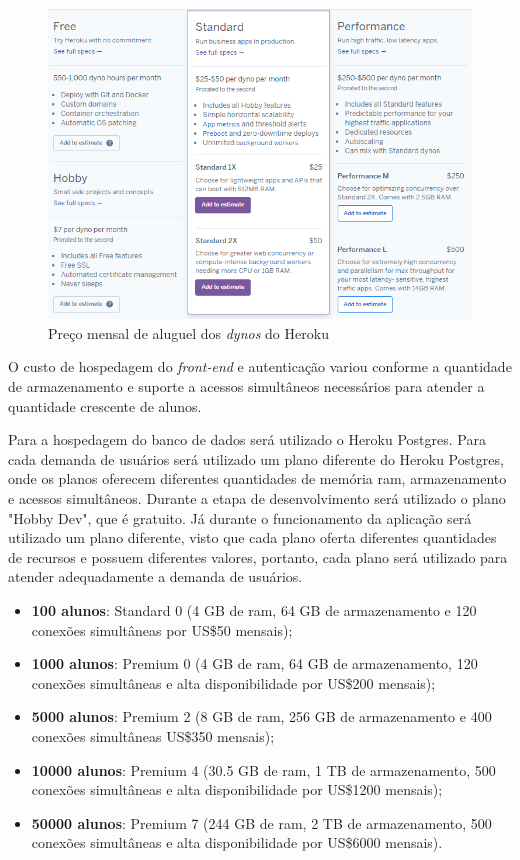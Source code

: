 \documentclass[
    12pt,               %
    openright,          %
    oneside,
    a4paper,            %
    english,            %
    brazil              %
    ]{ifsp-spo-inf-ctds} %
\begin{document}
\begin{figure}[htb]
    \centering
	\includegraphics[width=16cm]{imagens/precos-heroku.png}
	\caption{\label{fig:precos-heroku} Preço mensal de aluguel dos \textit{\glspl{dyno}} do Heroku}
\end{figure}

O custo de hospedagem do \textit{\gls{front-end}} e autenticação variou conforme a quantidade de armazenamento e suporte a acessos simultâneos necessários para atender a quantidade crescente de alunos.

Para a hospedagem do banco de dados será utilizado o Heroku Postgres. Para cada demanda de usuários será utilizado um plano diferente do Heroku Postgres, onde os planos oferecem diferentes quantidades de memória \ac{ram}, armazenamento e acessos simultâneos. Durante a etapa de desenvolvimento será utilizado o plano "Hobby Dev", que é gratuito. Já durante o funcionamento da aplicação será utilizado um plano diferente, visto que cada plano oferta diferentes quantidades de recursos e possuem diferentes valores, portanto, cada plano será utilizado para atender adequadamente a demanda de usuários.

\begin{itemize}
    \item \textbf{100 alunos}: Standard 0 (4 GB de \ac{ram}, 64 GB de armazenamento e 120 conexões simultâneas por US\$50 mensais);
    \item \textbf{1000 alunos}: Premium 0 (4 GB de \ac{ram}, 64 GB de armazenamento, 120 conexões simultâneas e alta disponibilidade por US\$200 mensais);
    \item \textbf{5000 alunos}: Premium 2 (8 GB de \ac{ram}, 256 GB de armazenamento e 400 conexões simultâneas US\$350 mensais);
    \item \textbf{10000 alunos}: Premium 4 (30.5 GB de \ac{ram}, 1 TB de armazenamento, 500 conexões simultâneas e alta disponibilidade por US\$1200 mensais);
    \item \textbf{50000 alunos}: Premium 7 (244 GB de \ac{ram}, 2 TB de armazenamento, 500 conexões simultâneas e alta disponibilidade por US\$6000 mensais).
\end{itemize}
\end{document}
